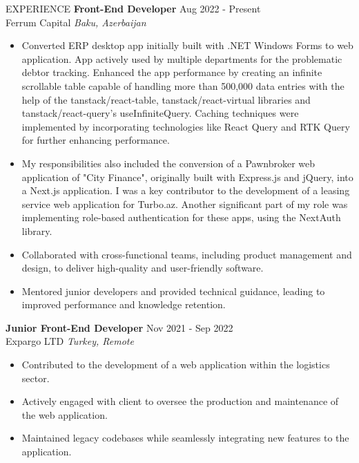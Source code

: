 \documentclass{resume} %
\begin{document}
\begin{rSection}{EXPERIENCE}
\textbf{Front-End Developer} \hfill Aug 2022 - Present\\
Ferrum Capital \hfill \textit{Baku, Azerbaijan}
 \begin{itemize}
    \itemsep -3pt {} 
    \item 
    Converted ERP desktop app initially built with .NET Windows Forms to web application. App actively used by multiple departments for the problematic debtor tracking. Enhanced the app performance by creating an infinite scrollable table capable of handling more than 500,000 data entries with the help of the tanstack/react-table, tanstack/react-virtual libraries and tanstack/react-query's useInfiniteQuery. Caching techniques were implemented by incorporating technologies like React Query and RTK Query for further enhancing performance.
    \item 
    My responsibilities also included the conversion of a Pawnbroker web application of "City Finance", originally built with Express.js and jQuery, into a Next.js application. I was a key contributor to the development of a leasing service web application for Turbo.az. Another significant part of my role was implementing role-based authentication for these apps, using the NextAuth library.
     \item Collaborated with cross-functional teams, including product management and design, to deliver high-quality and user-friendly software.
     \item Mentored junior developers and provided technical guidance, leading to improved performance and knowledge retention.
 \end{itemize}
 \vspace{2.5em}
\textbf{Junior Front-End Developer} \hfill Nov 2021 - Sep 2022\\
Expargo LTD \hfill \textit{Turkey, Remote}
 \begin{itemize}
    \itemsep -3pt {} 
     \item Contributed to the development of a web application within the logistics sector. 
     \item Actively engaged with client to oversee the production and maintenance of the web application.
     \item Maintained legacy codebases while seamlessly integrating new features to the application.
 \end{itemize}

\end{rSection} 

\end{document}
